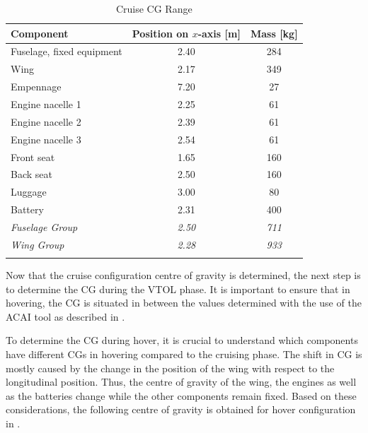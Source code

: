 \begin{table}[H]
    \centering
\caption{Cruise CG Range}
    \label{tab:CG_cruise}
\begin{tabular}{l|S[table-format=1.2]S[table-format=4]}
\toprule
\textbf{Component}                 & \textbf{Position on $x$-axis } {[}m{]} & \textbf{Mass } {[}kg{]} \\
\midrule
Fuselage, fixed equipment & 2.40                       & 284           \\
Wing                      & 2.17                       & 349           \\
Empennage                 & 7.20                       & 27            \\
Engine nacelle 1          & 2.25                       & 61            \\
Engine nacelle 2          & 2.39                       & 61            \\
Engine nacelle 3          & 2.54                       & 61            \\
Front seat                & 1.65                       & 160           \\
Back seat                 & 2.50                       & 160           \\
Luggage                   & 3.00                       & 80            \\
Battery                   & 2.31                       & 400           \\
\midrule
\textit{Fuselage Group}   & \textit{2.50}              & \textit{711}  \\
\textit{Wing Group}       & \textit{2.28}              & \textit{933}  \\
            &               &  \\
    \bottomrule
\end{tabular}
\end{table}

Now that the cruise configuration centre of gravity is determined, the next step is to determine the CG during the VTOL phase.
It is important to ensure that in hovering, the CG is situated in between the values determined with the use of the ACAI tool as described in .

To determine the CG during hover, it is crucial to understand which components have different CGs in hovering compared to the cruising phase.
The shift in CG is mostly caused by the change in the position of the wing with respect to the longitudinal position.
Thus, the centre of gravity of the wing, the engines as well as the batteries change while the other components remain fixed.
Based on these considerations, the following centre of gravity is obtained for hover configuration in .

